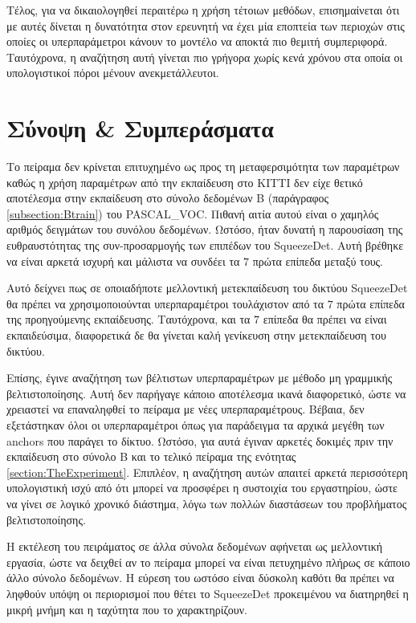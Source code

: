 Τέλος, για να δικαιολογηθεί περαιτέρω η χρήση τέτοιων μεθόδων, επισημαίνεται ότι με αυτές δίνεται η δυνατότητα στον ερευνητή να έχει μία εποπτεία των περιοχών στις οποίες οι υπερπαράμετροι κάνουν το μοντέλο να αποκτά πιο θεμιτή συμπεριφορά. Ταυτόχρονα, η αναζήτηση αυτή γίνεται πιο γρήγορα χωρίς κενά χρόνου στα οποία οι υπολογιστικοί πόροι μένουν ανεκμετάλλευτοι.




\section{Σύνοψη \& Συμπεράσματα}
Το πείραμα δεν κρίνεται επιτυχημένο ως προς τη μεταφερσιμότητα των παραμέτρων καθώς η χρήση παραμέτρων από την εκπαίδευση στο KITTI δεν είχε θετικό αποτέλεσμα στην εκπαίδευση στο σύνολο δεδομένων B (παράγραφος \ref{subsection:Btrain}) του PASCAL\_VOC. Πιθανή αιτία αυτού είναι ο χαμηλός αριθμός δειγμάτων του συνόλου δεδομένων. Ωστόσο, ήταν δυνατή η παρουσίαση της ευθραυστότητας της συν-προσαρμογής των επιπέδων του SqueezeDet. Αυτή βρέθηκε να είναι αρκετά ισχυρή και μάλιστα να συνδέει τα $7$ πρώτα επίπεδα μεταξύ τους.

Αυτό δείχνει πως σε οποιαδήποτε μελλοντική μετεκπαίδευση του δικτύου SqueezeDet θα πρέπει να χρησιμοποιούνται υπερπαραμέτροι τουλάχιστον από τα $7$ πρώτα επίπεδα της προηγούμενης εκπαίδευσης. Ταυτόχρονα, και τα $7$ επίπεδα θα πρέπει να είναι εκπαιδεύσιμα, διαφορετικά δε θα γίνεται καλή γενίκευση στην μετεκπαίδευση του δικτύου.

Επίσης, έγινε αναζήτηση των βέλτιστων υπερπαραμέτρων με μέθοδο μη γραμμικής βελτιστοποίησης. Αυτή δεν παρήγαγε κάποιο αποτέλεσμα ικανά διαφορετικό, ώστε να χρειαστεί να επαναληφθεί το πείραμα με νέες υπερπαραμέτρους. Βέβαια, δεν εξετάστηκαν όλοι οι υπερπαραμέτροι όπως για παράδειγμα τα αρχικά μεγέθη των anchors που παράγει το δίκτυο. Ωστόσο, για αυτά έγιναν αρκετές δοκιμές πριν την εκπαίδευση στο σύνολο B και το τελικό πείραμα της ενότητας \ref{section:TheExperiment}. Επιπλέον, η αναζήτηση αυτών απαιτεί αρκετά περισσότερη υπολογιστική ισχύ από ότι μπορεί να προσφέρει η συστοιχία του εργαστηρίου, ώστε να γίνει σε λογικό χρονικό διάστημα, λόγω των πολλών διαστάσεων του προβλήματος βελτιστοποίησης.

Η εκτέλεση του πειράματος σε άλλα σύνολα δεδομένων αφήνεται ως μελλοντική εργασία, ώστε να δειχθεί αν το πείραμα μπορεί να είναι πετυχημένο πλήρως σε κάποιο άλλο σύνολο δεδομένων. Η εύρεση του ωστόσο είναι δύσκολη καθότι θα πρέπει να ληφθούν υπόψη οι περιορισμοί που θέτει το SqueezeDet προκειμένου να διατηρηθεί η μικρή μνήμη και η ταχύτητα που το χαρακτηρίζουν.